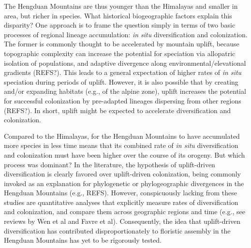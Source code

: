The Hengduan Mountains are thus younger than the Himalayas and smaller in area, but richer in species. What historical biogeographic factors explain this disparity? One approach is to frame the question simply in terms of two basic processes of regional lineage accumulation: \textit{in situ} diversification and colonization. The former is commonly thought to be accelerated by mountain uplift, because topographic complexity can increase the potential for speciation via allopatric isolation of populations, and adaptive divergence along environmental/elevational gradients (REFS?). This leads to a general expectation of higher rates of \textit{in situ} speciation during periods of uplift. However, it is also possible that by creating and/or expanding habitats (e.g., of the alpine zone), uplift increases the potential for successful colonization by pre-adapted lineages dispersing from other regions (REFS?). In short, uplift might be expected to accelerate diversification and colonization.

Compared to the Himalayas, for the Hengduan Mountains to have accumulated more species in less time means that its combined rate of \textit{in situ} diversification and colonization must have been higher over the course of its orogeny. But which process was dominant? In the literature, the hypothesis of uplift-driven diversification is clearly favored over uplift-driven colonization, being commonly invoked as an explanation for phylogenetic or phylogeographic divergences in the Hengduan Mountains (e.g., REFS). However, conspicuously lacking from these studies are quantitative analyses that explicitly measure rates of diversification and colonization, and compare them across geographic regions and time (e.g., see reviews by Wen et al and Favre et al). Consequently, the idea that uplift-driven diversification has contributed disproportionately to floristic assembly in the Hengduan Mountains has yet to be rigorously tested.




